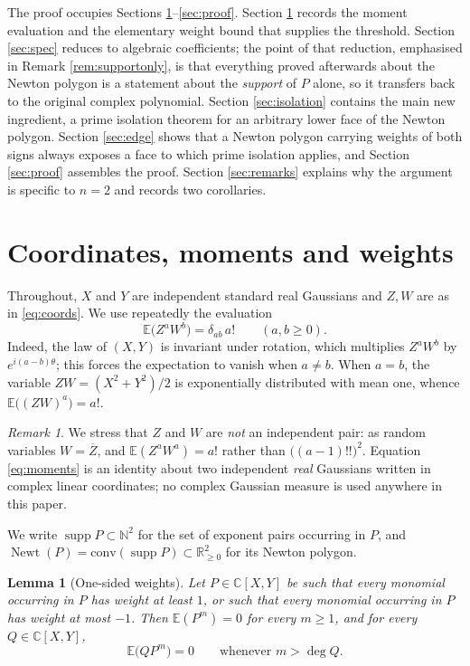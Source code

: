 \documentclass[11pt]{amsart}
\theoremstyle{plain}
\newtheorem{lemma}[theorem]{Lemma}
\theoremstyle{remark}
\newtheorem{remark}[theorem]{Remark}
\numberwithin{equation}{section}
\DeclareMathOperator{\Newt}{Newt}
\DeclareMathOperator{\supp}{supp}
\newcommand{\C}{\mathbb{C}}
\newcommand{\N}{\mathbb{N}}
\newcommand{\E}{\mathbb{E}}
\begin{document}
The proof occupies Sections \ref{sec:prelim}--\ref{sec:proof}. Section
\ref{sec:prelim} records the moment evaluation and the elementary weight bound
that supplies the threshold. Section \ref{sec:spec} reduces to algebraic
coefficients; the point of that reduction, emphasised in Remark
\ref{rem:supportonly}, is that everything proved afterwards about the Newton
polygon is a statement about the \emph{support} of $P$ alone, so it transfers
back to the original complex polynomial. Section \ref{sec:isolation} contains
the main new ingredient, a prime isolation theorem for an arbitrary lower face
of the Newton polygon. Section \ref{sec:edge} shows that a Newton polygon
carrying weights of both signs always exposes a face to which prime isolation
applies, and Section \ref{sec:proof} assembles the proof. Section
\ref{sec:remarks} explains why the argument is specific to $n=2$ and records two
corollaries.

\section{Coordinates, moments and weights}\label{sec:prelim}

Throughout, $X$ and $Y$ are independent standard real Gaussians and $Z,W$ are as
in \eqref{eq:coords}. We use repeatedly the evaluation
\begin{equation}\label{eq:moments}
  \E\bigl(Z^aW^b\bigr)=\delta_{ab}\,a! \qquad (a,b\ge0).
\end{equation}
Indeed, the law of $(X,Y)$ is invariant under rotation, which multiplies
$Z^aW^b$ by $e^{i(a-b)\theta}$; this forces the expectation to vanish when
$a\ne b$. When $a=b$, the variable $ZW=(X^2+Y^2)/2$ is exponentially
distributed with mean one, whence $\E\bigl((ZW)^a\bigr)=a!$.

\begin{remark}
We stress that $Z$ and $W$ are \emph{not} an independent pair: as random
variables $W=\overline Z$, and $\E(Z^aW^a)=a!$ rather than
$\bigl((a-1)!!\bigr)^2$. Equation \eqref{eq:moments} is an identity about two
independent \emph{real} Gaussians written in complex linear coordinates; no
complex Gaussian measure is used anywhere in this paper.
\end{remark}

We write $\supp P\subset\N^2$ for the set of exponent pairs occurring in $P$,
and $\Newt(P)=\mathrm{conv}(\supp P)\subset\mathbb R_{\ge0}^2$ for its Newton
polygon.

\begin{lemma}[One-sided weights]\label{lem:weights}
Let $P\in\C[X,Y]$ be such that every monomial occurring in $P$ has weight at
least $1$, or such that every monomial occurring in $P$ has weight at most
$-1$. Then $\E(P^m)=0$ for every $m\ge1$, and for every $Q\in\C[X,Y]$,
\[
  \E\bigl(QP^m\bigr)=0 \qquad\text{whenever } m>\deg Q .
\]
\end{lemma}
\end{document}
